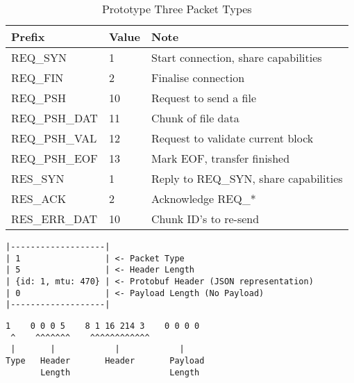 \begin{table}[ht]
	\caption{Prototype Three Packet Types}
	\label{tab:p3d-packet-types}
	\centering
	\begin{tabular}{ l l l }
		\hline
		\textbf{Prefix} & \textbf{Value} & \textbf{Note}                        \\
		\hline
		REQ\_SYN         & 1              & Start connection, share capabilities \\
		\hline
		REQ\_FIN         & 2              & Finalise connection                  \\
		\hline
		REQ\_PSH         & 10             & Request to send a file               \\
		\hline
		REQ\_PSH\_DAT     & 11             & Chunk of file data                   \\
		\hline
		REQ\_PSH\_VAL     & 12             & Request to validate current block    \\
		\hline
		REQ\_PSH\_EOF     & 13             & Mark EOF, transfer finished          \\
		\hline
		RES\_SYN         & 1              & Reply to REQ\_SYN, share capabilities \\
		\hline
		RES\_ACK         & 2              & Acknowledge REQ\_*                    \\
		\hline
		RES\_ERR\_DAT     & 10             & Chunk ID's to re-send                \\
		\hline
	\end{tabular}
\end{table}

\begin{lstlisting}[float,caption={Prototype Three Example Packet Structure},label=lst:p3d-example-structure]
|-------------------|
| 1                 | <- Packet Type
| 5                 | <- Header Length
| {id: 1, mtu: 470} | <- Protobuf Header (JSON representation)
| 0                 | <- Payload Length (No Payload)
|-------------------|
\end{lstlisting}

\begin{lstlisting}[float,caption={Prototype Three Example Packet Binary},label=lst:p3d-example-binary]
 1    0 0 0 5    8 1 16 214 3    0 0 0 0
 ^    ^^^^^^^    ^^^^^^^^^^^^
 |       |            |            |
Type   Header       Header       Payload
       Length                    Length
\end{lstlisting}
